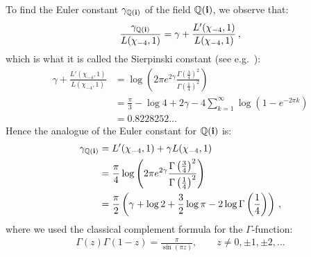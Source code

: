 \documentclass[reqno]{amsart}
\theoremstyle{plain}
\theoremstyle{definition}
\theoremstyle{remark}
\numberwithin{equation}{section}
\begin{document}
To find the Euler constant $\gamma_{{{\mathbb Q}}({{\bf i}})}$ of the field ${{\mathbb Q}}({{\bf i}})$, we
observe that:
\begin{align*}
  \frac{\gamma_{{{\mathbb Q}}({{\bf i}})}}{L(\chi_{-4},1)} = \gamma + \frac{L'(\chi_{-4},1)}{L(\chi_{-4},1)}\,,
\end{align*}
which is what it is called the Sierpinski constant (see
e.g.~\cite{finch}):
\begin{align*}
  \gamma + \frac{L'(\chi_{-4},1)}{L(\chi_{-4},1)} &=
        \log\left(2\pi e^{2\gamma} \frac{\Gamma\left(\frac34\right)^2}{\Gamma\left(\frac14\right)^2}\right)\\
        &=\frac{\pi}{3} - \log 4 + 2\gamma - 4\sum_{k=1}^\infty\log\left(1-e^{-2\pi k}\right)\\
        &= 0.8228252\dots
\end{align*}
Hence the analogue of the Euler constant for ${{\mathbb Q}}({{\bf i}})$ is:
\begin{align*}
  \gamma_{{{\mathbb Q}}({{\bf i}})} &= L'(\chi_{-4},1) + \gamma L(\chi_{-4},1)\\
  &= \frac{\pi}{4}\log\left(2\pi e^{2\gamma}
    \frac{\Gamma\left(\frac34\right)^2}{\Gamma\left(\frac14\right)^2}\right)\\
  &= \frac{\pi}{2}\left(\gamma + \log 2 + \frac32\log\pi -2\log\Gamma\left(\frac14\right)\right)\,,
\end{align*}
where we used the classical complement formula for the
$\Gamma$-function:
\begin{align*}
  \Gamma(z)\Gamma(1-z) = \frac{\pi}{\sin(\pi z)},
  \qquad z\neq 0,\pm 1,\pm 2,\dots
\end{align*}

\bigskip
\end{document}
